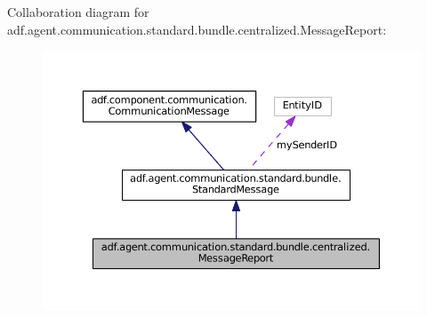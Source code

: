 Collaboration diagram for adf.\+agent.\+communication.\+standard.\+bundle.\+centralized.\+Message\+Report\+:
\nopagebreak
\begin{figure}[H]
\begin{center}
\leavevmode
\includegraphics[width=350pt]{classadf_1_1agent_1_1communication_1_1standard_1_1bundle_1_1centralized_1_1MessageReport__coll__graph}
\end{center}
\end{figure}
